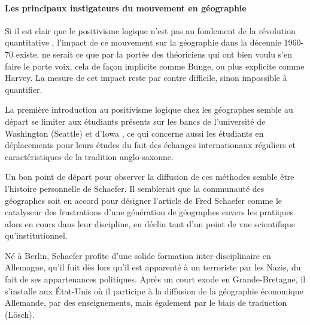 

\paragraph{Les principaux instigateurs du mouvement en géographie}
\label{p:instigateurs_mouvement}

Si il est clair que le positivisme logique n'est pas au fondement de la révolution quantitative \autocite{Claval2003}, l'impact de ce mouvement sur la géographie dans la décennie 1960-70 existe, ne serait ce que par la portée des théoriciens qui ont bien voulu s'en faire le porte voix, cela de façon implicite comme Bunge, ou plus  explicite comme Harvey. La mesure de cet impact reste par contre difficile, sinon impossible à quantifier.

La première introduction au positivisme logique chez les géographes semble au départ se limiter aux étudiants présents sur les bancs de l'université de Washington (Seattle) et d'Iowa \autocite[554]{Barnes2001a} \autocite[120-121]{Unwin1992}, ce qui concerne aussi les étudiants en déplacements pour leurs études du fait des échanges internationaux réguliers et caractéristiques de la tradition anglo-saxonne.

Un bon point de départ pour observer la diffusion de ces méthodes semble être l'histoire personnelle de Schaefer. Il semblerait que la communauté des géographes soit en accord \autocite[15]{Louail2010} pour désigner l'article de Fred Schaefer \autocite{Schaefer1953} comme le catalyseur des frustrations d'une génération de géographes envers les pratiques alors en cours dans leur discipline, en déclin tant d'un point de vue scientifique qu’institutionnel.

Né à Berlin, Schaefer profite d'une solide formation inter-disciplinaire en Allemagne, qu'il fuit dès lors qu'il est apparenté à un terroriste par les Nazis, du fait de ses appartenances politiques. Après un court exode en Grande-Bretagne, il s'installe aux État-Unis où il participe à la diffusion de la géographie économique Allemande, par des enseignements, mais également par le biais de traduction (Lösch). \autocite{Bunge1979}

